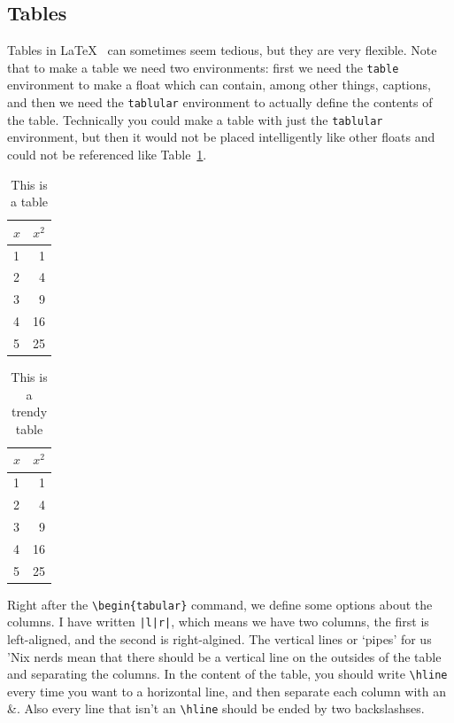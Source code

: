 \documentclass[twocolumn,10 pt,showpacs,preprintnumbers,amsmath,amssymb]{revtex4-1}
\begin{document}
\subsection{Tables}

Tables in \LaTeX~ can sometimes seem tedious, but they are very
flexible.  Note that to make a table we need two environments: first we
need the \texttt{table} environment to make a float which can contain,
among other things, captions, and then we need the \texttt{tablular}
environment to actually define the contents of the table.  Technically
you could make a table with just the \texttt{tablular} environment, but
then it would not be placed intelligently like other floats and could
not be referenced like Table~\ref{tbl:sqr}.
\begin{table}
  \centering
  \begin{tabular}{|l|r|} \hline
    $x$  &  $x^2$ \\ \hline
    1    &  1  \\
    2    &  4  \\
    3    &  9  \\
    4    &  16 \\
    5    &  25 \\ \hline
  \end{tabular}
  \caption{This is a table}
  \label{tbl:sqr}
\end{table}
\begin{table}
  \centering
  \begin{tabular}{lr} \hline \hline
    $x$  &  $x^2$\\ \hline
      1    &  1  \\
      2    &  4  \\
      3    &  9  \\
      4    &  16 \\
      5    &  25 \\ \hline
  \end{tabular}
  \caption{This is a trendy table}
  \label{tbl:trendy}
\end{table}
Right after the \verb_\begin{tabular}_ command, we define some options
about the columns.  I have written \texttt{|l|r|}, which means we have
two columns, the first is left-aligned, and the second is right-algined.
The vertical lines or `pipes' for us 'Nix nerds mean that there should
be a vertical line on the outsides of the table and separating the
columns.  In the content of the table, you should write \verb_\hline_
every time you want to a horizontal line, and then separate each column
with an \&.  Also every line that isn't an \verb_\hline_ should be ended
by two backslashses.
\end{document}
